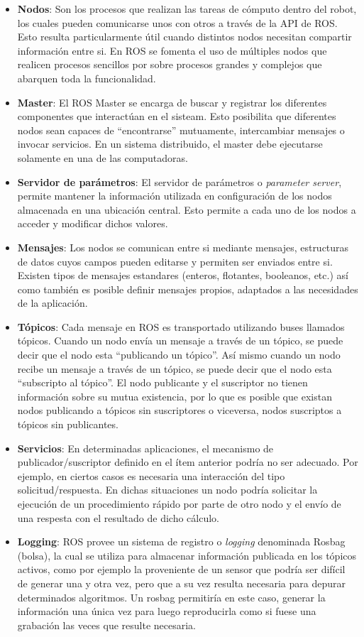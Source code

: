 \begin{itemize}
    \item \textbf{Nodos}: Son los procesos que realizan las tareas de cómputo dentro del robot, los cuales pueden comunicarse unos con otros a través de la API de ROS. Esto resulta particularmente útil cuando distintos nodos necesitan compartir información entre si. En ROS se fomenta el uso de múltiples nodos que realicen procesos sencillos por sobre procesos grandes y complejos que abarquen toda la funcionalidad.
    \item \textbf{Master}: El ROS Master se encarga de buscar y registrar los diferentes componentes que interactúan en el sisteam. Esto posibilita que diferentes nodos sean capaces de ``encontrarse'' mutuamente, intercambiar mensajes o invocar servicios. En un sistema distribuido, el master debe ejecutarse solamente en una de las computadoras.
    \item \textbf{Servidor de parámetros}: El servidor de parámetros o \textit{parameter server}, permite mantener la información utilizada en configuración de los nodos almacenada en una ubicación central. Esto permite a cada uno de los nodos a acceder y modificar dichos valores.
    \item \textbf{Mensajes}: Los nodos se comunican entre si mediante mensajes, estructuras de datos cuyos campos pueden editarse y permiten ser enviados entre si. Existen tipos de mensajes estandares (enteros, flotantes, booleanos, etc.) así como también es posible definir mensajes propios, adaptados a las necesidades de la aplicación.
    \item \textbf{Tópicos}: Cada mensaje en ROS es transportado utilizando buses llamados tópicos. Cuando un nodo envía un mensaje a través de un tópico, se puede decir que el nodo esta ``publicando un tópico''. Así mismo cuando un nodo recibe un mensaje a través de un tópico, se puede decir que el nodo esta ``subscripto al tópico''. El nodo publicante y el suscriptor no tienen información sobre su mutua existencia, por lo que es posible que existan nodos publicando a tópicos sin suscriptores o viceversa, nodos suscriptos a tópicos sin publicantes.
    \item \textbf{Servicios}: En determinadas aplicaciones, el mecanismo de publicador/suscriptor definido en el ítem anterior podría no ser adecuado. Por ejemplo, en ciertos casos es necesaria una interacción del tipo solicitud/respuesta. En dichas situaciones un nodo podría solicitar la ejecución de un procedimiento rápido por parte de otro nodo y el envío de una respesta con el resultado de dicho cálculo.
    \item \textbf{Logging}: ROS provee un sistema de registro o \textit{logging} denominada Rosbag (bolsa), la cual se utiliza para almacenar información publicada en los tópicos activos, como por ejemplo la proveniente de un sensor que podría ser difícil de generar una y otra vez, pero que a su vez resulta necesaria para depurar determinados algoritmos. Un rosbag permitiría en este caso, generar la información una única vez para luego reproducirla como si fuese una grabación las veces que resulte necesaria.
\end{itemize}

